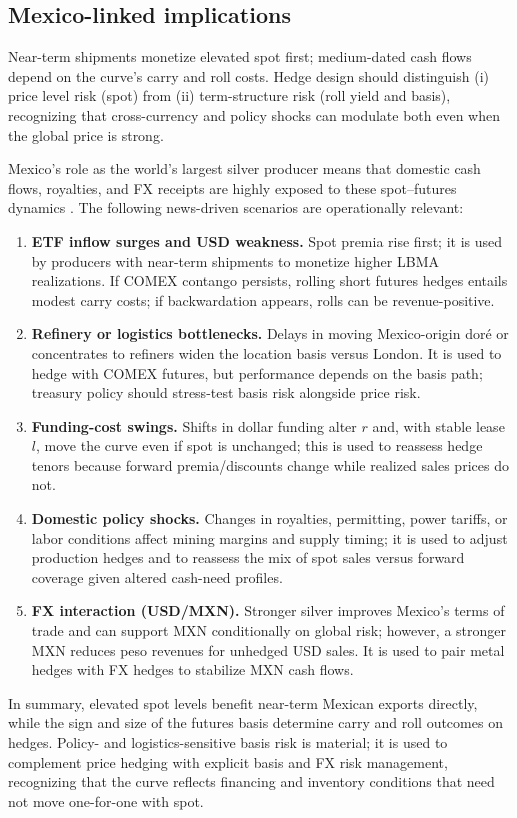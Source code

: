 \documentclass[11pt,a4paper]{article} %
\begin{document}
\subsection{Mexico-linked implications}
Near-term shipments monetize elevated spot first; medium-dated cash flows depend on the curve’s carry and roll costs. Hedge design should distinguish (i) price level risk (spot) from (ii) term-structure risk (roll yield and basis), recognizing that cross-currency and policy shocks can modulate both even when the global price is strong.

Mexico’s role as the world’s largest silver producer means that domestic cash flows, royalties, and FX receipts are highly exposed to these spot–futures dynamics \citep{reuters_mx_top_silver}. The following news-driven scenarios are operationally relevant:
\begin{enumerate}
  \item \textbf{ETF inflow surges and USD weakness.} Spot premia rise first; it is used by producers with near-term shipments to monetize higher LBMA realizations. If COMEX contango persists, rolling short futures hedges entails modest carry costs; if backwardation appears, rolls can be revenue-positive.
  \item \textbf{Refinery or logistics bottlenecks.} Delays in moving Mexico-origin doré or concentrates to refiners widen the location basis versus London. It is used to hedge with COMEX futures, but performance depends on the basis path; treasury policy should stress-test basis risk alongside price risk.
  \item \textbf{Funding-cost swings.} Shifts in dollar funding alter \(r\) and, with stable lease \(l\), move the curve even if spot is unchanged; this is used to reassess hedge tenors because forward premia/discounts change while realized sales prices do not.
  \item \textbf{Domestic policy shocks.} Changes in royalties, permitting, power tariffs, or labor conditions affect mining margins and supply timing; it is used to adjust production hedges and to reassess the mix of spot sales versus forward coverage given altered cash-need profiles.
  \item \textbf{FX interaction (USD/MXN).} Stronger silver improves Mexico’s terms of trade and can support MXN conditionally on global risk; however, a stronger MXN reduces peso revenues for unhedged USD sales. It is used to pair metal hedges with FX hedges to stabilize MXN cash flows.
\end{enumerate}
In summary, elevated spot levels benefit near-term Mexican exports directly, while the sign and size of the futures basis determine carry and roll outcomes on hedges. Policy- and logistics-sensitive basis risk is material; it is used to complement price hedging with explicit basis and FX risk management, recognizing that the curve reflects financing and inventory conditions that need not move one-for-one with spot.
\end{document}
